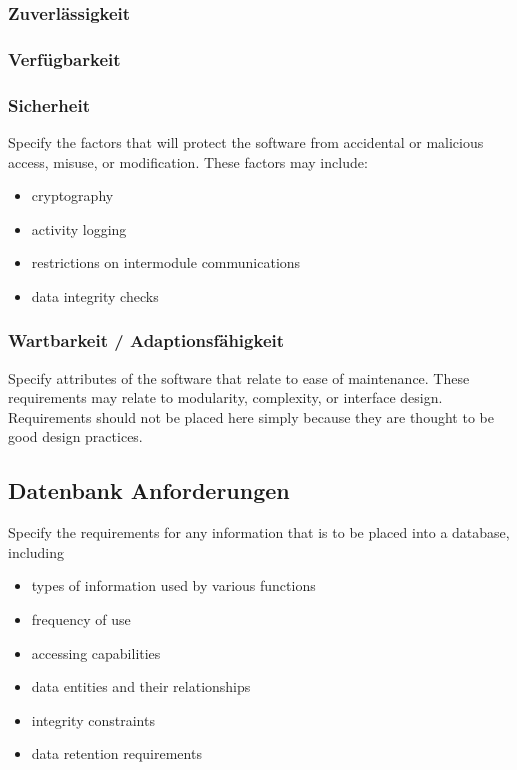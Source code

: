 \subsubsection{Zuverlässigkeit}

\subsubsection{Verfügbarkeit}

\subsubsection{Sicherheit}
Specify the factors that will protect the software from accidental or malicious access, misuse, or modification. These factors may include:
\begin{itemize}
	\item cryptography
	\item activity logging
	\item restrictions on intermodule communications
	\item data integrity checks
\end{itemize}

\subsubsection{Wartbarkeit / Adaptionsfähigkeit}
Specify attributes of the software that relate to ease of maintenance. These requirements may relate to modularity, complexity, or interface design. Requirements should not be placed here simply because they are thought to be good design practices.

\subsection{Datenbank Anforderungen}
Specify the requirements for any information that is to be placed into a database, including
\begin{itemize}
	\item types of information used by various functions
	\item frequency of use
	\item accessing capabilities
	\item data entities and their relationships
	\item integrity constraints
	\item data retention requirements
\end{itemize}

